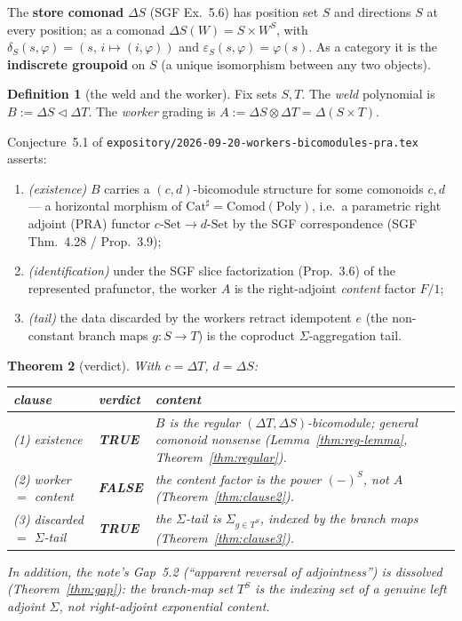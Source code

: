 \documentclass[11pt]{article}
\newtheorem{theorem}{Theorem}
\theoremstyle{definition}
\newtheorem{definition}[theorem]{Definition}
\newcommand{\Set}{\mathrm{Set}}
\newcommand{\Poly}{\mathrm{Poly}}
\newcommand{\Comod}{\mathrm{Comod}}
\newcommand{\Cat}{\mathrm{Cat}^{\sharp}}
\newcommand{\comp}{\triangleleft}
\begin{document}
The \textbf{store comonad} $\Delta S$ (SGF Ex.~5.6) has position set $S$ and directions
$S$ at every position; as a comonad $\Delta S(W)=S\times W^{S}$, with
$\delta_{S}(s,\varphi)=(s,\,i\mapsto(i,\varphi))$ and $\varepsilon_{S}(s,\varphi)=\varphi(s)$.
As a category it is the \textbf{indiscrete groupoid} on $S$ (a unique isomorphism between
any two objects).

\begin{definition}[the weld and the worker]
Fix sets $S,T$. The \emph{weld} polynomial is $B:=\Delta S\comp\Delta T$. The \emph{worker}
grading is $A:=\Delta S\otimes\Delta T=\Delta(S\times T)$.
\end{definition}

Conjecture~5.1 of \texttt{expository/2026-09-20-workers-bicomodules-pra.tex} asserts:
\begin{enumerate}
\item[\textbf{(1)}] \emph{(existence)} $B$ carries a $(c,d)$-bicomodule structure for some
comonoids $c,d$ --- a horizontal morphism of $\Cat=\Comod(\Poly)$, i.e.\ a parametric
right adjoint (PRA) functor $c\text{-}\Set\to d\text{-}\Set$ by the SGF correspondence
(SGF Thm.~4.28 / Prop.~3.9);
\item[\textbf{(2)}] \emph{(identification)} under the SGF slice factorization (Prop.~3.6)
of the represented prafunctor, the worker $A$ is the right-adjoint \emph{content} factor
$F/1$;
\item[\textbf{(3)}] \emph{(tail)} the data discarded by the workers retract idempotent
$e$ (the non-constant branch maps $g\colon S\to T$) is the coproduct
$\Sigma$-aggregation tail.
\end{enumerate}

\begin{theorem}[verdict]\label{thm:verdict}
With $c=\Delta T$, $d=\Delta S$:
\begin{center}
\renewcommand{\arraystretch}{1.25}
\begin{tabular}{p{}p{}p{}}
\hline
\textbf{clause} & \textbf{verdict} & \textbf{content}\\
\hline
(1) existence & \textbf{TRUE} & $B$ is the regular $(\Delta T,\Delta S)$-bicomodule;
general comonoid nonsense (Lemma~\ref{thm:reg-lemma}, Theorem~\ref{thm:regular}).\\
(2) worker $=$ content & \textbf{FALSE} & the content factor is the power $(-)^{S}$, not
$A$ (Theorem~\ref{thm:clause2}).\\
(3) discarded $=$ $\Sigma$-tail & \textbf{TRUE} & the $\Sigma$-tail is $\Sigma_{g\in T^{S}}$,
indexed by the branch maps (Theorem~\ref{thm:clause3}).\\
\hline
\end{tabular}
\end{center}
In addition, the note's \emph{Gap~5.2} (``apparent reversal of adjointness'') is
\emph{dissolved} (Theorem~\ref{thm:gap}): the branch-map set $T^{S}$ is the indexing set
of a genuine left adjoint $\Sigma$, not right-adjoint exponential content.
\end{theorem}
\end{document}
